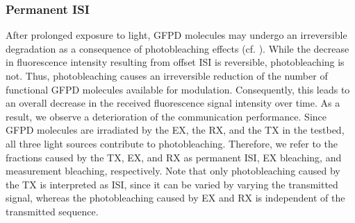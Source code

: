 \subsubsection{Permanent ISI}\label{subsubsec:permanent_isi}
\scaleSubsubsectionBelow
After prolonged exposure to light, \ac{GFPD} molecules may undergo an irreversible degradation as a consequence of photobleaching effects (cf. ). While the decrease in fluorescence intensity resulting from offset \ac{ISI} is reversible, photobleaching is not. Thus, photobleaching causes an irreversible reduction of the number of functional \ac{GFPD} molecules available for modulation. Consequently, this leads to an overall decrease in the received fluorescence signal intensity over time. As a result, we observe a deterioration of the communication performance.
Since \ac{GFPD} molecules are irradiated by the \ac{EX}, the \ac{RX}, and the \ac{TX} in the testbed, all three light sources contribute to photobleaching. Therefore, we refer to the fractions caused by the \ac{TX}, \ac{EX}, and \ac{RX} as permanent \ac{ISI}, \ac{EX} bleaching, and measurement bleaching, respectively. Note that only photobleaching caused by the \ac{TX} is interpreted as \ac{ISI}, since it can be varied by varying the transmitted signal, whereas the photobleaching caused by \ac{EX} and \ac{RX} is independent of the transmitted sequence.